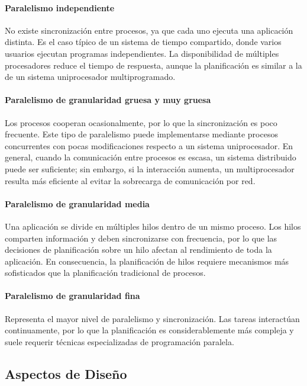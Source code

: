 \paragraph{Paralelismo independiente}

No existe sincronización entre procesos, ya que cada uno ejecuta una aplicación distinta. Es el caso típico de un sistema de tiempo compartido, donde varios usuarios ejecutan programas independientes. La disponibilidad de múltiples procesadores reduce el tiempo de respuesta, aunque la planificación es similar a la de un sistema uniprocesador multiprogramado.

\paragraph{Paralelismo de granularidad gruesa y muy gruesa}

Los procesos cooperan ocasionalmente, por lo que la sincronización es poco frecuente. Este tipo de paralelismo puede implementarse mediante procesos concurrentes con pocas modificaciones respecto a un sistema uniprocesador. En general, cuando la comunicación entre procesos es escasa, un sistema distribuido puede ser suficiente; sin embargo, si la interacción aumenta, un multiprocesador resulta más eficiente al evitar la sobrecarga de comunicación por red.

\paragraph{Paralelismo de granularidad media}

Una aplicación se divide en múltiples hilos dentro de un mismo proceso. Los hilos comparten información y deben sincronizarse con frecuencia, por lo que las decisiones de planificación sobre un hilo afectan al rendimiento de toda la aplicación. En consecuencia, la planificación de hilos requiere mecanismos más sofisticados que la planificación tradicional de procesos.

\paragraph{Paralelismo de granularidad fina}

Representa el mayor nivel de paralelismo y sincronización. Las tareas interactúan continuamente, por lo que la planificación es considerablemente más compleja y suele requerir técnicas especializadas de programación paralela.

\subsection{Aspectos de Diseño}

